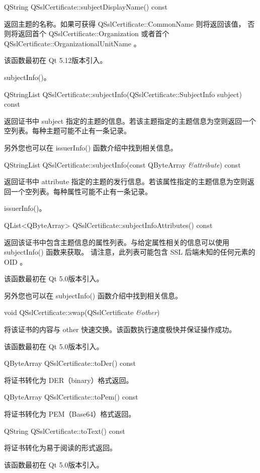 QString QSslCertificate::subjectDisplayName() const

返回主题的名称。如果可获得 QSslCertificate::CommonName 则将返回该值，
否则将返回首个 QSslCertificate::Organization 
或者首个 QSslCertificate::OrganizationalUnitName 。

该函数最初在 Qt 5.12版本引入。

\begin{seeAlso}
subjectInfo()。
\end{seeAlso}

QStringList QSslCertificate::subjectInfo(QSslCertificate::SubjectInfo subject) const

返回证书中 subject 指定的主题的信息。若该主题指定的主题信息为空则返回一个空列表。每种主题可能不止有一条记录。

另外您也可以在 issuerInfo() 函数介绍中找到相关信息。

QStringList QSslCertificate::subjectInfo(const QByteArray \emph{\&attribute}) const

返回证书中 attribute 指定的主题的发行信息。若该属性指定的主题信息为空则返回一个空列表。每种属性可能不止有一条记录。

\begin{seeAlso}
issuerInfo()。
\end{seeAlso}

QList<QByteArray> QSslCertificate::subjectInfoAttributes() const

返回该证书中包含主题信息的属性列表。与给定属性相关的信息可以使用 subjectInfo() 函数来获取。
请注意，此列表可能包含 SSL 后端未知的任何元素的 OID 。

该函数最初在 Qt 5.0版本引入。

另外您也可以在 subjectInfo() 函数介绍中找到相关信息。

void QSslCertificate::swap(QSslCertificate \emph{\&other})

将该证书的内容与 other 快速交换。该函数执行速度极快并保证操作成功。

该函数最初在 Qt 5.0版本引入。

QByteArray QSslCertificate::toDer() const

将证书转化为 DER（binary）格式返回。

QByteArray QSslCertificate::toPem() const

将证书转化为 PEM（Base64）格式返回。

QString QSslCertificate::toText() const

将证书转化为易于阅读的形式返回。

该函数最初在 Qt 5.0版本引入。

